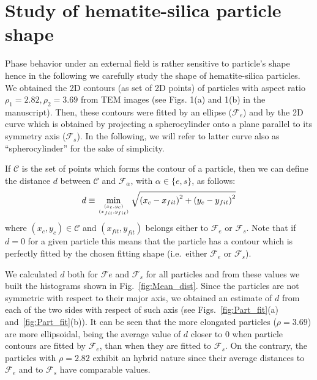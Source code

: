 \documentclass[aip,graphicx]{revtex4-1} %
\def\ontop#1#2{\genfrac{}{}{0pt}{}{#1}{#2}}
\begin{document}
\section{Study of hematite-silica particle shape}
Phase behavior under an external field is rather sensitive to particle's shape hence in the following
we carefully study the shape of hematite-silica particles.
We obtained the 2D contours (as set of 2D points) of particles with aspect ratio $\rho_1 = 2.82, \rho_2 = 3.69$ from TEM images 
(see Figs. 1(a) and 1(b) in the manuscript).
Then, these contours were fitted by an ellipse ($\mathcal{F}_{e}$) and by the 2D curve which is obtained by projecting a spherocylinder 
onto a plane parallel to its symmetry axis ($\mathcal{F}_{s}$). In the following, we will refer to latter curve also as 
``spherocylinder'' for the sake of simplicity.

If $\mathcal{C}$ is the set of points which forms the contour of a particle, then we can define the distance $d$ between
$\mathcal{C}$ and $\mathcal{F}_\alpha$, with $\alpha\in\{e,s\}$, as follows:
\begin{equation}
  d \equiv \min_{\ontop{(x_c,y_c)}{(x_{fit}, y_{fit})}} \sqrt{{(x_c - x_{fit})}^2 + {(y_c - y_{fit})}^2}\label{eq:distdef}
\end{equation}
where $(x_c,y_c)\in \mathcal{C}$ and $(x_{fit},y_{fit})$ belongs either to $\mathcal{F}_e$ or $\mathcal{F}_s$.
Note that if $d=0$ for a given particle this means that the particle has a contour which is perfectly fitted
by the chosen fitting shape (i.e.~either $\mathcal{F}_e$ or $\mathcal{F}_s$).

We calculated $d$ both for $\mathcal{F}e$ and $\mathcal{F}_s$ for all particles and from these values we built the histograms 
shown in Fig.~\ref{fig:Mean_dist}.
Since the particles are not symmetric with respect to their major axis, we obtained an estimate of $d$ from each of the two 
sides with respect of such axis (see Figs.~\ref{fig:Part_fit}(a) and~\ref{fig:Part_fit}(b)).
It can be seen that the more elongated particles ($\rho = 3.69$) are more ellipsoidal, being the average value of $d$ closer
to $0$ when particle contours are fitted by $\mathcal{F}_e$, than when they are fitted to $\mathcal{F}_s$. 
On the contrary, the particles with $\rho = 2.82$ exhibit an hybrid nature since their average distances to $\mathcal{F}_e$ and 
to $\mathcal{F}_s$ have comparable values. 
\end{document}
